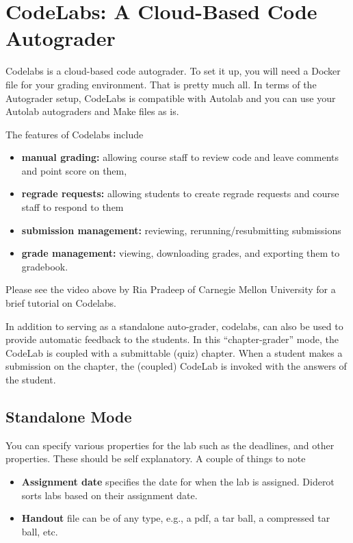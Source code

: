 \chapter{CodeLabs: A Cloud-Based Code Autograder}
\label{ch:codelabs}

Codelabs is a cloud-based code autograder.  To set it up, you will
need a Docker file for your grading environment.  That is pretty much
all.  In terms of the Autograder setup, CodeLabs is compatible with
Autolab and you can use your Autolab autograders and Make files as is.

The features of Codelabs include
\begin{itemize}
\item  
\textbf{manual grading:} allowing course staff to review code and leave comments and point
score on them,

\item
\textbf{regrade requests:} allowing students to create regrade
requests and course staff to respond to them

\item
  \textbf{submission management:} reviewing, rerunning/resubmitting submissions

\item
  \textbf{grade management:} viewing, downloading grades, and exporting them to gradebook.
\end{itemize}
%
Please see the video above by Ria Pradeep of Carnegie Mellon University for a brief tutorial on Codelabs.

In addition to serving as a standalone auto-grader, codelabs, can also
be used to provide automatic feedback to the students.
%
In this ``chapter-grader'' mode, the CodeLab is coupled with a submittable
(quiz) chapter.
%
When a student makes a submission on the chapter, the (coupled) CodeLab is invoked with the answers of the student.

\section{Standalone Mode}
\label{sec:codelabs::standalone}

\begin{gram}
You can specify various properties for the lab such as the deadlines, and other properties.  These should be self explanatory.  A couple of things to note


\begin{itemize}
\item \textbf{Assignment date} specifies the date for when the lab is assigned.  Diderot sorts  labs based on their assignment date.
\item \textbf{Handout} file can be of any type, e.g., a pdf, a tar ball, a compressed tar ball, etc.
\end{itemize}

\end{gram}


